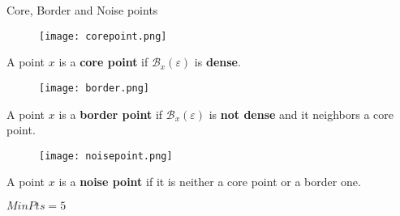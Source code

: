 \documentclass[aspectratio=169]{beamer}
\renewcommand{\epsilon}{\varepsilon}
\newcommand{\B}[2]{\mathcal{B}_{#1}\left(#2\right)}
\begin{document}
\begin{frame}{Core, Border and Noise points}
    \noindent
    \begin{minipage}[t]{0.3\textwidth}
        
        \begin{figure}
            \centering
            \texttt{[image: corepoint.png]}
        \end{figure}
        
        A point $x$ is a \textbf{core point} if $\B{x}{\epsilon}$ is \textbf{dense}.
        
    
    \end{minipage}
    \hfill
    \begin{minipage}[t]{0.3\textwidth}
        \begin{figure}
            \centering
            \texttt{[image: border.png]}
        \end{figure}

        A point $x$ is a \textbf{border point} if $\B{x}{\epsilon}$ is \textbf{not dense} and it neighbors a core point.
    \end{minipage}
    \hfill
    \begin{minipage}[t]{0.3\textwidth}
        \begin{figure}
            \centering
            \texttt{[image: noisepoint.png]}
        \end{figure}
        
        A point $x$ is a \textbf{noise point} if it is neither a core point or a border one.
        
    \end{minipage}

\vspace{1.1cm}

    
    \raggedleft\footnotesize $MinPts=5$
    

\end{frame}
\end{document}

